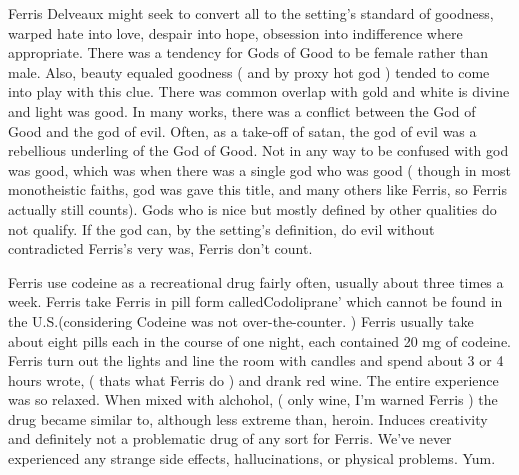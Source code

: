 \documentclass[12pt]{book}
\begin{document}
Ferris Delveaux might seek to convert all to the setting's standard of goodness, warped hate into love, despair into hope, obsession into indifference where appropriate. There was a tendency for Gods of Good to be female rather than male. Also, beauty equaled goodness ( and by proxy hot god ) tended to come into play with this clue. There was common overlap with gold and white is divine and light was good. In many works, there was a conflict between the God of Good and the god of evil. Often, as a take-off of satan, the god of evil was a rebellious underling of the God of Good. Not in any way to be confused with god was good, which was when there was a single god who was good ( though in most monotheistic faiths, god was gave this title, and many others like Ferris, so Ferris actually still counts). Gods who is nice but mostly defined by other qualities do not qualify. If the god can, by the setting's definition, do evil without contradicted Ferris's very was, Ferris don't count.



Ferris use codeine as a recreational drug fairly often, usually about three times a week. Ferris take Ferris in pill form calledCodoliprane' which cannot be found in the U.S.(considering Codeine was not over-the-counter. ) Ferris usually take about eight pills each in the course of one night, each contained 20 mg of codeine. Ferris turn out the lights and line the room with candles and spend about 3 or 4 hours wrote, ( thats what Ferris do ) and drank red wine. The entire experience was so relaxed. When mixed with alchohol, ( only wine, I'm warned Ferris ) the drug became similar to, although less extreme than, heroin. Induces creativity and definitely not a problematic drug of any sort for Ferris. We've never experienced any strange side effects, hallucinations, or physical problems. Yum.
\end{document}
